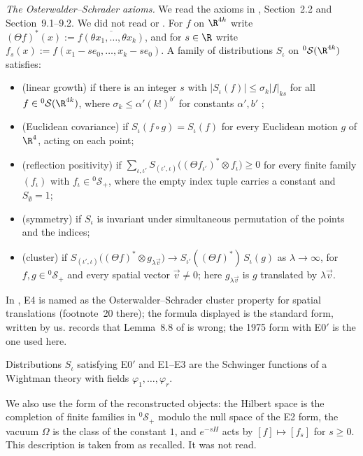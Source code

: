 \emph{The Osterwalder--Schrader axioms.} We read the axioms in \cite{KQR21}, Section~2.2 and Section~9.1--9.2. We did not read \cite{OS73} or \cite{OS75}. For $f$ on $\R^{4k}$ write $(\Theta f)^*(x):=\overline{f(\theta x_1,\dots,\theta x_k)}$, and for $s\in\R$ write $f_s(x):=f(x_1-se_0,\dots,x_k-se_0)$. A family of distributions $S_\iota$ on ${}^0\mathcal S(\R^{4k})$ satisfies:
\begin{itemize}
\item[E0$'$] (linear growth) if there is an integer $s$ with $|S_\iota(f)|\le\sigma_k|f|_{ks}$ for all $f\in{}^0\mathcal S(\R^{4k})$, where $\sigma_k\le\alpha'(k!)^{b'}$ for constants $\alpha',b'$ \cite[eq.~(9.18)]{KQR21};
\item[E1] (Euclidean covariance) if $S_\iota(f\circ g)=S_\iota(f)$ for every Euclidean motion $g$ of $\R^4$, acting on each point;
\item[E2] (reflection positivity) if $\sum_{\iota,\iota'}S_{(\iota',\iota)}\bigl((\Theta f_{\iota'})^*\otimes f_\iota\bigr)\ge0$ for every finite family $(f_\iota)$ with $f_\iota\in{}^0\mathcal S_+$, where the empty index tuple carries a constant and $S_\emptyset=1$;
\item[E3] (symmetry) if $S_\iota$ is invariant under simultaneous permutation of the points and the indices;
\item[E4] (cluster) if $S_{(\iota',\iota)}\bigl((\Theta f)^*\otimes g_{\lambda\vec v}\bigr)\to S_{\iota'}((\Theta f)^*)\,S_\iota(g)$ as $\lambda\to\infty$, for $f,g\in{}^0\mathcal S_+$ and every spatial vector $\vec v\ne0$; here $g_{\lambda\vec v}$ is $g$ translated by $\lambda\vec v$.
\end{itemize}
In \cite{KQR21}, E4 is named as the Osterwalder--Schrader cluster property for spatial translations (footnote~20 there); the formula displayed is the standard form, written by us. \cite[Section~9.2.1]{KQR21} records that Lemma~8.8 of \cite{OS73} is wrong; the 1975 form with E0$'$ is the one used here.

\begin{theorem}\label{red:OS}
Distributions $S_\iota$ satisfying E0$'$ and E1--E3 are the Schwinger functions of a Wightman theory with fields $\varphi_1,\dots,\varphi_r$.
\end{theorem}

We also use the form of the reconstructed objects: the Hilbert space is the completion of finite families in ${}^0\mathcal S_+$ modulo the null space of the E2 form, the vacuum $\Omega$ is the class of the constant $1$, and $e^{-sH}$ acts by $[f]\mapsto[f_s]$ for $s\ge0$. This description is taken from \cite[Section~4]{OS73} as recalled. It was not read.

